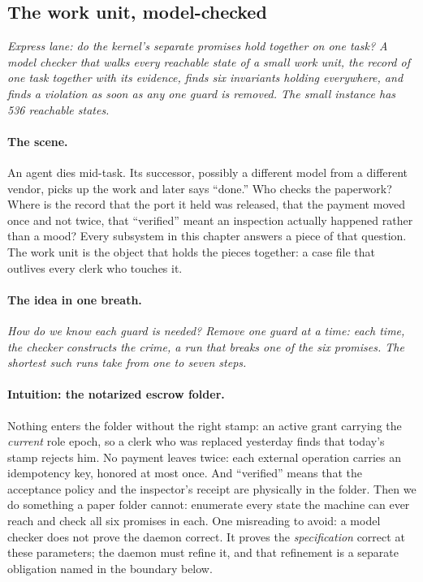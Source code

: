 \documentclass[11pt,a4paper]{article}
\theoremstyle{definition}
\theoremstyle{remark}
\begin{document}
\subsection{The work unit, model-checked}
\label{sec:workunit}

\noindent\emph{Express lane: do the kernel's separate promises hold together on
one task? A model checker that walks every reachable state of a small work
unit, the record of one task together with its evidence, finds six invariants
holding everywhere, and finds a violation as soon as any one guard is removed.
The small instance has 536 reachable states.}

\paragraph{The scene.}
An agent dies mid-task. Its successor, possibly a different model from a different vendor,
picks up the work and later says ``done.'' Who checks the paperwork? Where is the record
that the port it held was released, that the payment moved once and not twice, that
``verified'' meant an inspection actually happened rather than a mood? Every subsystem in this
chapter answers a piece of that question. The work unit is the object that holds the
pieces together: a case file that outlives every clerk who touches it.

\paragraph{The idea in one breath.}
\emph{How do we know each guard is needed? Remove one guard at a time: each
time, the checker constructs the crime, a run that breaks one of the six
promises. The
shortest such runs take from one to seven steps.}

\paragraph{Intuition: the notarized escrow folder.}
Nothing enters the folder without the right stamp: an active grant carrying the
\emph{current} role epoch, so a clerk who was replaced yesterday finds that today's stamp
rejects him. No payment leaves twice: each external operation carries an idempotency key,
honored at most once. And ``verified'' means that the acceptance policy and
the inspector's receipt are physically in the folder. Then we do something a paper folder
cannot: enumerate every state the machine can ever reach and check all six promises in each.
One misreading to avoid: a model checker does not prove the daemon correct. It proves the
\emph{specification} correct at these parameters; the daemon must refine it, and that
refinement is a separate obligation named in the boundary below.
\end{document}
